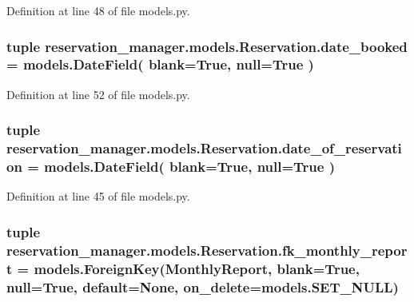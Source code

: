 Definition at line 48 of file models.\-py.

\hypertarget{classreservation__manager_1_1models_1_1Reservation_aa936091d190e04a52c4b9da7ee2ded77}{
\subsubsection[{date\-\_\-booked}]{\setlength{\rightskip}{0pt plus 5cm}tuple reservation\-\_\-manager.\-models.\-Reservation.\-date\-\_\-booked = models.\-Date\-Field( blank=True, null=True )\hspace{0.3cm}{\ttfamily [static]}}}\label{classreservation__manager_1_1models_1_1Reservation_aa936091d190e04a52c4b9da7ee2ded77}


Definition at line 52 of file models.\-py.

\hypertarget{classreservation__manager_1_1models_1_1Reservation_a25c61b7deefe701dcfc4db65f134875d}{
\subsubsection[{date\-\_\-of\-\_\-reservation}]{\setlength{\rightskip}{0pt plus 5cm}tuple reservation\-\_\-manager.\-models.\-Reservation.\-date\-\_\-of\-\_\-reservation = models.\-Date\-Field( blank=True, null=True )\hspace{0.3cm}{\ttfamily [static]}}}\label{classreservation__manager_1_1models_1_1Reservation_a25c61b7deefe701dcfc4db65f134875d}


Definition at line 45 of file models.\-py.

\hypertarget{classreservation__manager_1_1models_1_1Reservation_ac21f0b3528f8e3ba53c3e24231a303cc}{
\subsubsection[{fk\-\_\-monthly\-\_\-report}]{\setlength{\rightskip}{0pt plus 5cm}tuple reservation\-\_\-manager.\-models.\-Reservation.\-fk\-\_\-monthly\-\_\-report = models.\-Foreign\-Key({\bf Monthly\-Report}, blank=True, null=True, default=None, on\-\_\-delete=models.\-S\-E\-T\-\_\-\-N\-U\-L\-L)\hspace{0.3cm}{\ttfamily [static]}}}\label{classreservation__manager_1_1models_1_1Reservation_ac21f0b3528f8e3ba53c3e24231a303cc}


